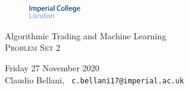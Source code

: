 \documentclass[10pt,a4paper]{article}
\date{Friday 27 November 2020}
\begin{document}
	
	\begin{center}
		\begin{figure}
			\includegraphics[width=0.2\textwidth]{imperial_logo_light}
		\end{figure}
	\begin{Large}
		Algorithmic Trading and Machine Learning \\
		\textsc{Problem Set 2}
	\end{Large}
	\end{center}

\vspace{0.2cm}

\noindent Friday 27 November 2020 \\
\noindent Claudio Bellani, \small{\texttt{ c.bellani17@imperial.ac.uk}}

\vspace{0.5cm}
\end{document}
